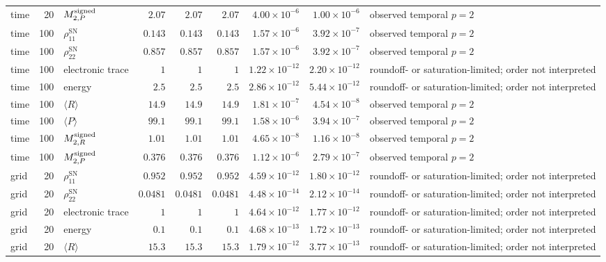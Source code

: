 \begin{landscape}
\begin{longtable}{l r l r r r r r L{0.18\textwidth}}
time & 20 & $M^{\rm signed}_{2,P}$ & $2.07$ & $2.07$ & $2.07$ & $4.00\times10^{-6}$ & $1.00\times10^{-6}$ & observed temporal $p=2$ \\
time & 100 & $\rho_{11}^{\mathrm{SN}}$ & $0.143$ & $0.143$ & $0.143$ & $1.57\times10^{-6}$ & $3.92\times10^{-7}$ & observed temporal $p=2$ \\
time & 100 & $\rho_{22}^{\mathrm{SN}}$ & $0.857$ & $0.857$ & $0.857$ & $1.57\times10^{-6}$ & $3.92\times10^{-7}$ & observed temporal $p=2$ \\
time & 100 & electronic trace & $1$ & $1$ & $1$ & $1.22\times10^{-12}$ & $2.20\times10^{-12}$ & roundoff- or saturation-limited; order not interpreted \\
time & 100 & energy & $2.5$ & $2.5$ & $2.5$ & $2.86\times10^{-12}$ & $5.44\times10^{-12}$ & roundoff- or saturation-limited; order not interpreted \\
time & 100 & $\langle R\rangle$ & $14.9$ & $14.9$ & $14.9$ & $1.81\times10^{-7}$ & $4.54\times10^{-8}$ & observed temporal $p=2$ \\
time & 100 & $\langle P\rangle$ & $99.1$ & $99.1$ & $99.1$ & $1.58\times10^{-6}$ & $3.94\times10^{-7}$ & observed temporal $p=2$ \\
time & 100 & $M^{\rm signed}_{2,R}$ & $1.01$ & $1.01$ & $1.01$ & $4.65\times10^{-8}$ & $1.16\times10^{-8}$ & observed temporal $p=2$ \\
time & 100 & $M^{\rm signed}_{2,P}$ & $0.376$ & $0.376$ & $0.376$ & $1.12\times10^{-6}$ & $2.79\times10^{-7}$ & observed temporal $p=2$ \\
grid & 20 & $\rho_{11}^{\mathrm{SN}}$ & $0.952$ & $0.952$ & $0.952$ & $4.59\times10^{-12}$ & $1.80\times10^{-12}$ & roundoff- or saturation-limited; order not interpreted \\
grid & 20 & $\rho_{22}^{\mathrm{SN}}$ & $0.0481$ & $0.0481$ & $0.0481$ & $4.48\times10^{-14}$ & $2.12\times10^{-14}$ & roundoff- or saturation-limited; order not interpreted \\
grid & 20 & electronic trace & $1$ & $1$ & $1$ & $4.64\times10^{-12}$ & $1.77\times10^{-12}$ & roundoff- or saturation-limited; order not interpreted \\
grid & 20 & energy & $0.1$ & $0.1$ & $0.1$ & $4.68\times10^{-13}$ & $1.72\times10^{-13}$ & roundoff- or saturation-limited; order not interpreted \\
grid & 20 & $\langle R\rangle$ & $15.3$ & $15.3$ & $15.3$ & $1.79\times10^{-12}$ & $3.77\times10^{-13}$ & roundoff- or saturation-limited; order not interpreted \\

\end{longtable}
\end{landscape}
